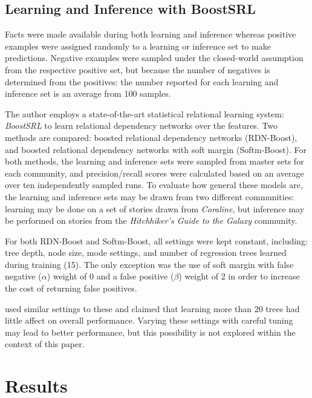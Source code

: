 \documentclass[letterpaper]{article}
\begin{document}
\subsection{Learning and Inference with BoostSRL}

Facts were made available during both learning and inference whereas positive examples were assigned randomly to a learning or inference set to make predictions.  Negative examples were sampled under the closed-world assumption from the respective positive set, but because the number of negatives is determined from the positives: the number reported for each learning and inference set is an average from 100 samples.

The author employs a state-of-the-art statistical relational learning system: \textit{BoostSRL} to learn relational dependency networks over the features. Two methods are compared: boosted relational dependency networks (RDN-Boost), and boosted relational dependency networks with soft margin (Softm-Boost). For both methods, the learning and inference sets were sampled from master sets for each community, and precision/recall scores were calculated based on an average over ten independently sampled runs. To evaluate how general these models are, the learning and inference sets may be drawn from two different communities: learning may be done on a set of stories drawn from \textit{Coraline}, but inference may be performed on stories from the \textit{Hitchhiker's Guide to the Galaxy} community.

For both RDN-Boost and Softm-Boost, all settings were kept constant, including: tree depth, node size, mode settings, and number of regression trees learned during training (15). The only exception was the use of soft margin with false negative ($\alpha$) weight of 0 and a false positive ($\beta$) weight of 2 in order to increase the cost of returning false positives.

\cite{yang2017combining} used similar settings to these and claimed that learning more than 20 trees had little affect on overall performance. Varying these settings with careful tuning may lead to better performance, but this possibility is not explored within the context of this paper.

\section{Results}

\end{document}
